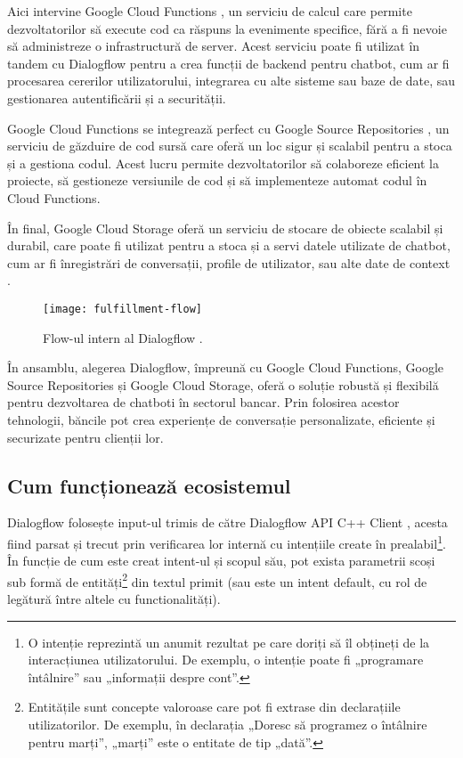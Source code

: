 Aici intervine Google Cloud Functions \cite{google_cloud_functions}, un serviciu de calcul care permite dezvoltatorilor să execute cod ca răspuns la evenimente specifice, fără a fi nevoie să administreze o infrastructură de server. Acest serviciu poate fi utilizat în tandem cu Dialogflow pentru a crea funcții de backend pentru chatbot, cum ar fi procesarea cererilor utilizatorului, integrarea cu alte sisteme sau baze de date, sau gestionarea autentificării și a securității.

Google Cloud Functions se integrează perfect cu Google Source Repositories \cite{google_source_repositories}, un serviciu de găzduire de cod sursă care oferă un loc sigur și scalabil pentru a stoca și a gestiona codul. Acest lucru permite dezvoltatorilor să colaboreze eficient la proiecte, să gestioneze versiunile de cod și să implementeze automat codul în Cloud Functions.

În final, Google Cloud Storage oferă un serviciu de stocare de obiecte scalabil și durabil, care poate fi utilizat pentru a stoca și a servi datele utilizate de chatbot, cum ar fi înregistrări de conversații, profile de utilizator, sau alte date de context \cite{google_cloud_storage}.

\begin{figure}[h]
    \centering
    \texttt{[image: fulfillment-flow]}
    \caption{Flow-ul intern al Dialogflow \cite{google_dialogflow}.}
\end{figure}

În ansamblu, alegerea Dialogflow, împreună cu Google Cloud Functions, Google Source Repositories și Google Cloud Storage, oferă o soluție robustă și flexibilă pentru dezvoltarea de chatboti în sectorul bancar. Prin folosirea acestor tehnologii, băncile pot crea experiențe de conversație personalizate, eficiente și securizate pentru clienții lor.

\subsection{Cum funcționează ecosistemul}

Dialogflow folosește input-ul trimis de către Dialogflow API C++ Client \cite{dialogflow_client_library}, acesta fiind parsat și trecut prin verificarea lor internă cu intențiile create în prealabil\footnote{O intenție reprezintă un anumit rezultat pe care doriți să îl obțineți de la interacțiunea utilizatorului. De exemplu, o intenție poate fi „programare întâlnire” sau „informații despre cont”.}. În funcție de cum este creat intent-ul și scopul său, pot exista parametrii scoși sub formă de entități\footnote{Entitățile sunt concepte valoroase care pot fi extrase din declarațiile utilizatorilor. De exemplu, în declarația „Doresc să programez o întâlnire pentru marți”, „marți” este o entitate de tip „dată”.} din textul primit (sau este un intent default, cu rol de legătură între altele cu functionalități).

